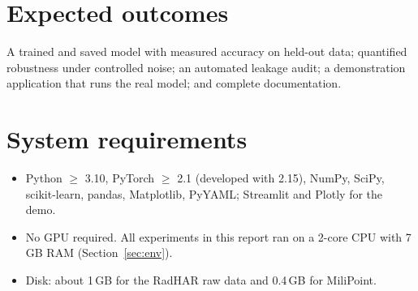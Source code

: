 \section{Expected outcomes}
A trained and saved model with measured accuracy on held-out data; quantified
robustness under controlled noise; an automated leakage audit; a demonstration
application that runs the real model; and complete documentation.

\section{System requirements}
\begin{itemize}[nosep]
\item Python $\geq$ 3.10, PyTorch $\geq$ 2.1 (developed with 2.15), NumPy, SciPy,
  scikit-learn, pandas, Matplotlib, PyYAML; Streamlit and Plotly for the demo.
\item No GPU required. All experiments in this report ran on a 2-core CPU with
  7\,GB RAM (Section~\ref{sec:env}).
\item Disk: about 1\,GB for the RadHAR raw data and 0.4\,GB for MiliPoint.
\end{itemize}
